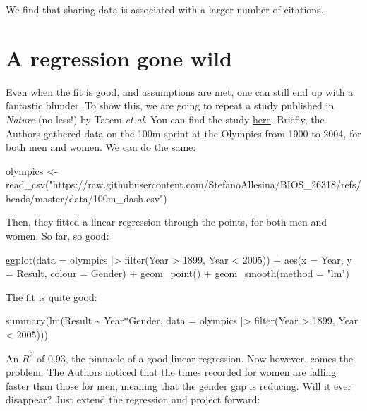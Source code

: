 \documentclass[
  letterpaper,
  DIV=11,
  numbers=noendperiod]{scrreprt}
\newenvironment{Shaded}{\begin{snugshade}}{\end{snugshade}}
\newcommand{\NormalTok}[1]{\textcolor[rgb]{0.00,0.23,0.31}{#1}}
\begin{document}
We find that sharing data is associated with a larger number of
citations.

\section{A regression gone wild}\label{a-regression-gone-wild}

Even when the fit is good, and assumptions are met, one can still end up
with a fantastic blunder. To show this, we are going to repeat a study
published in \emph{Nature} (no less!) by Tatem \emph{et al}. You can
find the study \href{https://www.nature.com/articles/431525a}{here}.
Briefly, the Authors gathered data on the 100m sprint at the Olympics
from 1900 to 2004, for both men and women. We can do the same:

\begin{Shaded}
\begin{Highlighting}[]
\NormalTok{olympics \textless{}{-} read\_csv("https://raw.githubusercontent.com/StefanoAllesina/BIOS\_26318/refs/heads/master/data/100m\_dash.csv")}
\end{Highlighting}
\end{Shaded}

Then, they fitted a linear regression through the points, for both men
and women. So far, so good:

\begin{Shaded}
\begin{Highlighting}[]
\NormalTok{ggplot(data = olympics |\textgreater{} filter(Year \textgreater{} 1899, Year \textless{} 2005)) + }
\NormalTok{  aes(x = Year, y = Result, colour = Gender) + }
\NormalTok{  geom\_point() + geom\_smooth(method = "lm")}
\end{Highlighting}
\end{Shaded}

The fit is quite good:

\begin{Shaded}
\begin{Highlighting}[]
\NormalTok{summary(lm(Result \textasciitilde{} Year*Gender,}
\NormalTok{  data = olympics |\textgreater{} filter(Year \textgreater{} 1899, Year \textless{} 2005)))}
\end{Highlighting}
\end{Shaded}

An \(R^2\) of 0.93, the pinnacle of a good linear regression. Now
however, comes the problem. The Authors noticed that the times recorded
for women are falling faster than those for men, meaning that the gender
gap is reducing. Will it ever disappear? Just extend the regression and
project forward:
\end{document}
